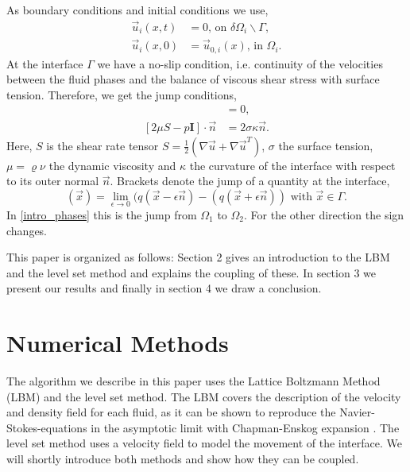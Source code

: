 \documentclass[final,leqno,onefignum,onetabnum]{siamltexmm}
\begin{document}
As boundary conditions and initial conditions we use,
\begin{align}
  \vec u_i(x,t) &= 0 \text{, on } \delta\Omega_i \backslash \Gamma \text{,} \\
  \vec u_i(x,0) &= \vec u_{0,i}(x) \text{, in } \Omega_i \text{.}
\end{align}
At the interface $\Gamma$ we have a no-slip condition, i.e. continuity of the velocities between the fluid phases and the balance of viscous shear stress with surface tension. Therefore, we get the jump conditions,
\begin{align}
  [\vec u] &= 0 \text{,  } \\
  [2\mu S - p \mathbf{I}] \cdot \vec n &= 2 \sigma \kappa \vec n \text{.}
	\label{jumpconditions}
\end{align}
Here, $S$ is the shear rate tensor $S=\frac12 \left( \nabla \vec u + \nabla {\vec u}^T\right)$, $\sigma$ the surface tension, $\mu = \varrho \nu$ the dynamic viscosity and $\kappa$ the curvature of the interface with respect to its outer normal $\vec n$. Brackets denote the jump of a quantity at the interface, 
\begin{equation}
	[q](\vec x) = \lim_{\epsilon \rightarrow 0} (q(\vec x - \epsilon \vec n) - (q(\vec x + \epsilon \vec n)) \text{ with } \vec x \in \Gamma. %
\end{equation}
In \cref{intro_phases} this is the jump from $\Omega_1$ to $\Omega_2$. For the other direction the sign changes.

This paper is organized as follows: Section 2 gives an introduction to the LBM and the level set method and explains the coupling of these. In section 3 we present our results and finally in section 4 we draw a conclusion.

\section{Numerical Methods}
The algorithm we describe in this paper uses the Lattice Boltzmann Method (LBM) and the level set method. The LBM covers the description of the velocity and density field for each fluid, as it can be shown to reproduce the Navier-Stokes-equations in the asymptotic limit with Chapman-Enskog expansion \cite{LBM3}. The level set method uses a velocity field to model the movement of the interface. We will shortly introduce both methods and show how they can be coupled.
\end{document}
